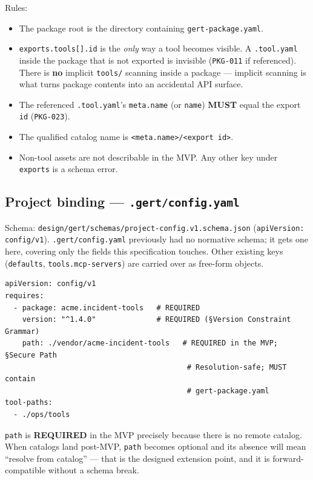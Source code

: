 Rules:
\begin{itemize}
  \item The package root is the directory containing \texttt{gert-package.yaml}.
  \item \texttt{exports.tools[].id} is the \emph{only} way a tool becomes
        visible. A \texttt{.tool.yaml} inside the package that is not
        exported is invisible (\texttt{PKG-011} if referenced). There is
        \textbf{no} implicit \texttt{tools/} scanning inside a package ---
        implicit scanning is what turns package contents into an accidental
        API surface.
  \item The referenced \texttt{.tool.yaml}'s \texttt{meta.name} (or
        \texttt{name}) \textbf{MUST} equal the export \texttt{id}
        (\texttt{PKG-023}).
  \item The qualified catalog name is \texttt{<meta.name>/<export id>}.
  \item Non-tool assets are not describable in the MVP. Any other key under
        \texttt{exports} is a schema error.
\end{itemize}

\subsection{Project binding --- \texttt{.gert/config.yaml}}
\label{sec:tool-project-config}

Schema: \texttt{design/gert/schemas/project-config.v1.schema.json}
(\texttt{apiVersion: config/v1}). \texttt{.gert/config.yaml} previously had
no normative schema; it gets one here, covering only the fields this
specification touches. Other existing keys (\texttt{defaults},
\texttt{tools.mcp-servers}) are carried over as free-form objects.

\begin{verbatim}
apiVersion: config/v1
requires:
  - package: acme.incident-tools   # REQUIRED
    version: "^1.4.0"              # REQUIRED (§Version Constraint Grammar)
    path: ./vendor/acme-incident-tools   # REQUIRED in the MVP; §Secure Path
                                          # Resolution-safe; MUST contain
                                          # gert-package.yaml
tool-paths:
  - ./ops/tools
\end{verbatim}

\texttt{path} is \textbf{REQUIRED} in the MVP precisely because there is no
remote catalog. When catalogs land post-MVP, \texttt{path} becomes optional
and its absence will mean ``resolve from catalog'' --- that is the designed
extension point, and it is forward-compatible without a schema break.

